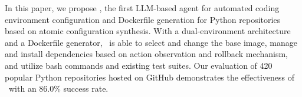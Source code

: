 In this paper, we propose \tool, the first LLM-based agent for automated coding environment configuration and Dockerfile generation for Python repositories based on atomic configuration synthesis. With a dual-environment architecture and a Dockerfile generator, \tool~is able to select and change the base image, manage and install dependencies based on action observation and rollback mechanism, and utilize bash commands and existing test suites. Our evaluation of 420 popular Python repositories hosted on GitHub demonstrates the effectiveness of \tool~with an 86.0\% success rate.
